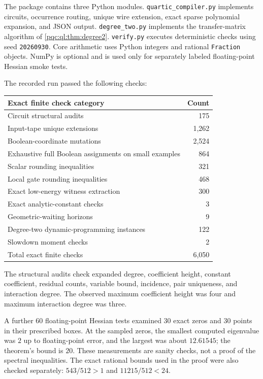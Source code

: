 \documentclass[11pt,letterpaper]{article}
\numberwithin{equation}{section}
\theoremstyle{definition}
\theoremstyle{remark}
\begin{document}
The package contains three Python modules. \texttt{quartic\_compiler.py}
implements circuits, occurrence routing, unique wire extension, exact
sparse polynomial expansion, and JSON output. \texttt{degree\_two.py}
implements the transfer-matrix algorithm of \cref{pqc:ql:thm:degree2}.
\texttt{verify.py} executes deterministic checks using seed
\texttt{20260930}. Core arithmetic uses Python integers and rational
\texttt{Fraction} objects. NumPy is optional and is used only for
separately labeled floating-point Hessian smoke tests.

The recorded run passed the following checks:
\begin{center}
\begin{tabular}{lr}
\toprule
Exact finite check category & Count\\
\midrule
Circuit structural audits & 175\\
Input-tape unique extensions & 1,262\\
Boolean-coordinate mutations & 2,524\\
Exhaustive full Boolean assignments on small examples & 864\\
Scalar rounding inequalities & 321\\
Local gate rounding inequalities & 468\\
Exact low-energy witness extraction & 300\\
Exact analytic-constant checks & 3\\
Geometric-waiting horizons & 9\\
Degree-two dynamic-programming instances & 122\\
Slowdown moment checks & 2\\
\midrule
Total exact finite checks & 6,050\\
\bottomrule
\end{tabular}
\end{center}
The structural audits check expanded degree, coefficient height, constant
coefficient, residual counts, variable bound, incidence, pair uniqueness,
and interaction degree. The observed maximum coefficient height was four
and maximum interaction degree was three.

A further 60 floating-point Hessian tests examined 30 exact zeros and 30
points in their prescribed boxes. At the sampled zeros, the smallest
computed eigenvalue was $2$ up to floating-point error, and the largest
was about $12.61545$; the theorem's bound is $20$. These measurements are
sanity checks, not a proof of the spectral inequalities. The exact
rational bounds used in the proof were also checked separately:
$543/512>1$ and $11215/512<24$.
\end{document}

